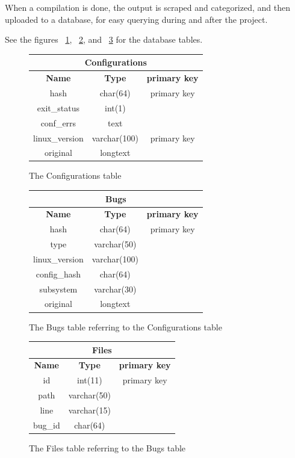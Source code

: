 \documentclass[a4paper,11pt]{report}
\newcommand{\figa}{
    \begin{figure}[!htpb]
    \centering
}
\newcommand{\figb}[2]{
    \caption{#1}
    \label{#2}
    \end{figure}
}
\begin{document}
When a compilation is done, the output is scraped and categorized, and then 
uploaded to a database, for easy querying during and after the project. 

See the figures ~\ref{fig:conftable}, ~\ref{fig:bugstable}, and 
~\ref{fig:filestable} for the database tables.


\figa
    \begin{tabular}{c|c|c}
        \hline 
        \hline
        \multicolumn{3}{c}{\textbf{Configurations}} \\
        \hline
        \textbf{Name} & \textbf{Type} &\textbf{primary key} \\
        \hline
        hash & char(64) & primary key \\
        exit\_status & int(1) \\
        conf\_errs & text \\
        linux\_version & varchar(100) & primary key \\
        original & longtext \\
        \hline
        \hline
    \end{tabular}
\figb{The Configurations table}{fig:conftable}

\figa
    \begin{tabular}{c|c|c}
        \hline
        \hline
        \multicolumn{3}{c}{\textbf{Bugs}} \\
        \hline
        \textbf{Name} & \textbf{Type} &\textbf{primary key} \\
        \hline
        hash & char(64) & primary key \\
        type & varchar(50) \\
        linux\_version & varchar(100) \\
        config\_hash & char(64) \\
        subsystem & varchar(30) \\
        original & longtext \\
        \hline
        \hline
    \end{tabular}
\figb{The Bugs table referring to the Configurations table}{fig:bugstable}

\figa
    \begin{tabular}{c|c|c}
        \hline
        \hline
        \multicolumn{3}{c}{\textbf{Files}} \\
        \hline
        \textbf{Name} & \textbf{Type} &\textbf{primary key} \\
        \hline
        id & int(11) & primary key \\
        path & varchar(50) \\
        line & varchar(15) \\
        bug\_id & char(64) \\
        \hline
        \hline
    \end{tabular}
\figb{The Files table referring to the Bugs table}{fig:filestable}
\end{document}
